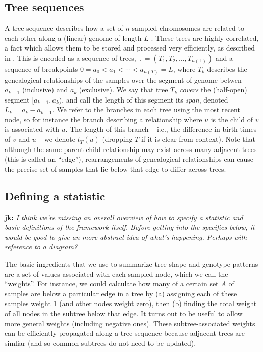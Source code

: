 \documentclass{article}
\newcommand{\treeseq}{\mathbb{T}} %
\newcommand{\jk}[1]{{\color{red}\textbf{jk:} \it #1}}
\begin{document}
\subsection*{Tree sequences}

A tree sequence describes how a set of $n$ sampled chromosomes
are related to each other along a (linear) genome of length $L$ \citep{kelleher2016efficient}.
These trees are highly correlated,
a fact which allows them to be stored and processed very efficiently,
as described in \citet{kelleher2018efficient}.
This is encoded as a sequence of trees, $\treeseq = (T_1, T_2, \ldots,
T_{n(\treeseq)})$
and a sequence of breakpoints $0 = a_0 < a_1 < \cdots < a_{n(T)} = L$,
where $T_k$ describes the genealogical relationships of the samples
over the segment of genome betwen $a_{k-1}$ (inclusive) and $a_k$ (exclusive).
We say that tree $T_k$ \emph{covers} the (half-open) segment $[a_{k-1}, a_k)$,
and call the length of this segment its \emph{span}, denoted $L_k = a_k - a_{k-1}$.
We refer to the branches in each tree using the most recent node,
so for instance the branch describing a relationship where $u$ is the child of $v$
is associated with $u$.
The length of this branch -- i.e., the difference in birth times of $v$ and $u$ --
we denote $t_T(u)$ (dropping $T$ if it is clear from context).
Note that although the same parent-child relationship may exist across many adjacent trees
(this is called an ``edge''),
rearrangements of genealogical relationships
can cause the precise set of samples that lie below that edge to differ across
trees.


\subsection*{Defining a statistic}

\jk{I think we're missing an overall overview of how to specify a statistic
and basic definitions of the framework itself. Before getting into the
specifics below, it would be good to give an more abstract idea of
what's happening. Perhaps with reference to a diagram?}

The basic ingredients that we use to summarize tree shape and genotype patterns
are a set of values associated with each sampled node, which we call the ``weights''.
For instance, we could calculate how many of a certain set $A$ of samples
are below a particular edge in a tree
by (a) assigning each of these samples weight 1 (and other nodes weight zero), then
(b) finding the total weight of all nodes in the subtree below that edge.
It turns out to be useful to allow more general weights (including negative ones).
These subtree-associated weights can be efficiently propagated along a tree sequence
because adjacent trees are simliar (and so common subtrees do not need to be updated).
\end{document}
